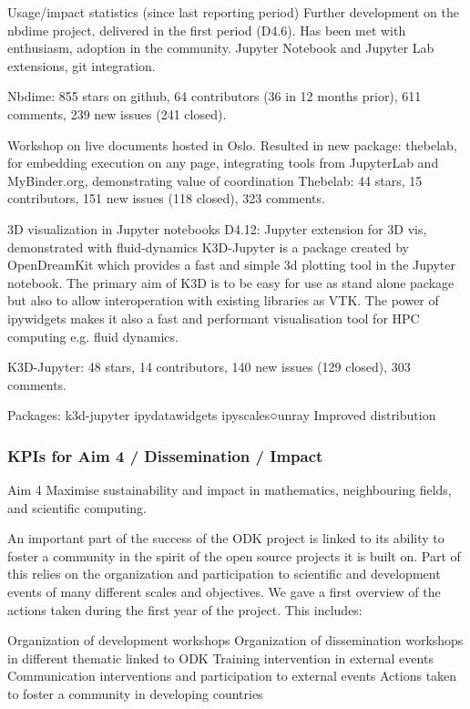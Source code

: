 \begin{Aim 1}
\begin{Aim 2}
\begin{itemize}
Usage/impact statistics (since last reporting period)
Further development on the nbdime project, delivered in the first period (D4.6). Has been met with enthusiasm, adoption in the community.
Jupyter Notebook and Jupyter Lab extensions, git integration.

Nbdime: 855 stars on github, 64 contributors (36 in 12 months prior), 611 
comments, 239 new issues (241 closed).

Workshop on live documents hosted in Oslo. Resulted in new package: thebelab, for embedding execution on any page, integrating tools from 
JupyterLab and MyBinder.org, demonstrating value of coordination
Thebelab: 44 stars, 15 contributors, 151 new issues (118 closed), 323 
comments.

3D visualization in Jupyter notebooks D4.12: Jupyter extension for 3D vis, demonstrated with fluid-dynamics
K3D-Jupyter is a package created by OpenDreamKit which provides a fast and simple 3d plotting tool in the Jupyter notebook. The primary aim 
of K3D is to be easy for use as stand alone package but also to allow interoperation with existing libraries as VTK. The power of ipywidgets 
makes it also a fast and performant visualisation tool for HPC computing e.g. fluid dynamics.

K3D-Jupyter: 48 stars, 14 contributors, 140 new issues (129 closed), 303 
comments.

Packages:
k3d-jupyter
ipydatawidgets
ipyscales○unray
Improved distribution

\subsubsection{KPIs for Aim 4 / Dissemination / Impact}

\begin{recommendation}{Aim 4}
  Maximise sustainability and impact in mathematics, neighbouring fields, and scientific computing.\end{recommendation}


An important part of the success of the ODK project is linked to its ability to foster a community in the spirit of the open source projects 
it is built on. Part of this relies on the organization and participation to scientific and development events of many different scales and 
objectives. We gave a first overview of the actions taken during the first year of the project. This includes:

    Organization of development workshops
    Organization of dissemination workshops in different thematic linked to ODK
    Training intervention in external events
    Communication interventions and participation to external events
    Actions taken to foster a community in developing countries



\end{itemize}
\end{Aim 2}
\end{Aim 1}
